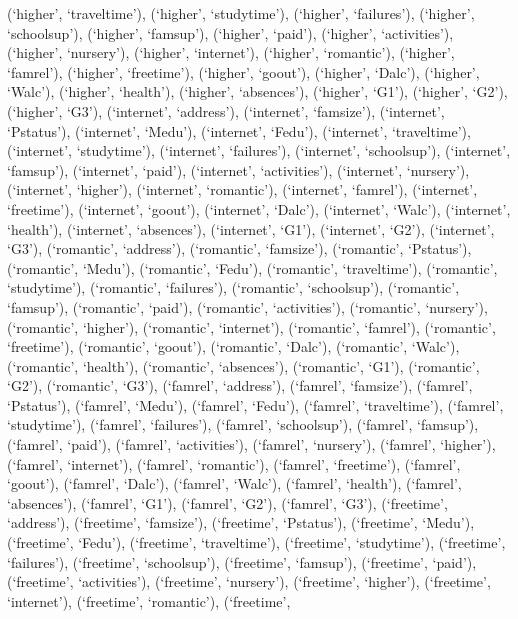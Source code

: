 \documentclass[
]{article}
\begin{document}
(`higher', `traveltime'), (`higher', `studytime'), (`higher',
`failures'), (`higher', `schoolsup'), (`higher', `famsup'), (`higher',
`paid'), (`higher', `activities'), (`higher', `nursery'), (`higher',
`internet'), (`higher', `romantic'), (`higher', `famrel'), (`higher',
`freetime'), (`higher', `goout'), (`higher', `Dalc'), (`higher',
`Walc'), (`higher', `health'), (`higher', `absences'), (`higher', `G1'),
(`higher', `G2'), (`higher', `G3'), (`internet', `address'),
(`internet', `famsize'), (`internet', `Pstatus'), (`internet', `Medu'),
(`internet', `Fedu'), (`internet', `traveltime'), (`internet',
`studytime'), (`internet', `failures'), (`internet', `schoolsup'),
(`internet', `famsup'), (`internet', `paid'), (`internet',
`activities'), (`internet', `nursery'), (`internet', `higher'),
(`internet', `romantic'), (`internet', `famrel'), (`internet',
`freetime'), (`internet', `goout'), (`internet', `Dalc'), (`internet',
`Walc'), (`internet', `health'), (`internet', `absences'), (`internet',
`G1'), (`internet', `G2'), (`internet', `G3'), (`romantic', `address'),
(`romantic', `famsize'), (`romantic', `Pstatus'), (`romantic', `Medu'),
(`romantic', `Fedu'), (`romantic', `traveltime'), (`romantic',
`studytime'), (`romantic', `failures'), (`romantic', `schoolsup'),
(`romantic', `famsup'), (`romantic', `paid'), (`romantic',
`activities'), (`romantic', `nursery'), (`romantic', `higher'),
(`romantic', `internet'), (`romantic', `famrel'), (`romantic',
`freetime'), (`romantic', `goout'), (`romantic', `Dalc'), (`romantic',
`Walc'), (`romantic', `health'), (`romantic', `absences'), (`romantic',
`G1'), (`romantic', `G2'), (`romantic', `G3'), (`famrel', `address'),
(`famrel', `famsize'), (`famrel', `Pstatus'), (`famrel', `Medu'),
(`famrel', `Fedu'), (`famrel', `traveltime'), (`famrel', `studytime'),
(`famrel', `failures'), (`famrel', `schoolsup'), (`famrel', `famsup'),
(`famrel', `paid'), (`famrel', `activities'), (`famrel', `nursery'),
(`famrel', `higher'), (`famrel', `internet'), (`famrel', `romantic'),
(`famrel', `freetime'), (`famrel', `goout'), (`famrel', `Dalc'),
(`famrel', `Walc'), (`famrel', `health'), (`famrel', `absences'),
(`famrel', `G1'), (`famrel', `G2'), (`famrel', `G3'), (`freetime',
`address'), (`freetime', `famsize'), (`freetime', `Pstatus'),
(`freetime', `Medu'), (`freetime', `Fedu'), (`freetime', `traveltime'),
(`freetime', `studytime'), (`freetime', `failures'), (`freetime',
`schoolsup'), (`freetime', `famsup'), (`freetime', `paid'), (`freetime',
`activities'), (`freetime', `nursery'), (`freetime', `higher'),
(`freetime', `internet'), (`freetime', `romantic'), (`freetime',
\end{document}
